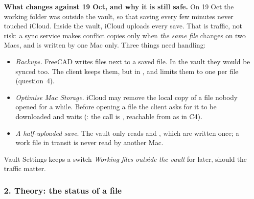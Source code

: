 \textbf{What changes against 19 Oct, and why it is still safe.} On 19 Oct the working folder was outside the vault,
so that saving every few minutes never touched iCloud. Inside the vault, iCloud uploads every save. That is
traffic, not risk: a sync service makes conflict copies only when \emph{the same file} changes on two Macs, and
 is written by one Mac only. Three things need handling:
\begin{itemize}[nosep]
  \item \emph{Backups.} FreeCAD writes  files next to a saved file. In the vault they would be synced
        too. The client keeps them, but in , and limits them to one per file
        (question~4).
  \item \emph{Optimise Mac Storage.} iCloud may remove the local copy of a file nobody opened for a while. Before
        opening a file the client asks for it to be downloaded and waits (\verify: the call is
        , reachable from  as in C4).
  \item \emph{A half-uploaded save.} The vault only reads  and , which are written
        once; a work file in transit is never read by another Mac.
\end{itemize}
Vault Settings keeps a switch \emph{Working files outside the vault} for later, should the traffic matter.

\subsubsection*{2. Theory: the status of a file}


